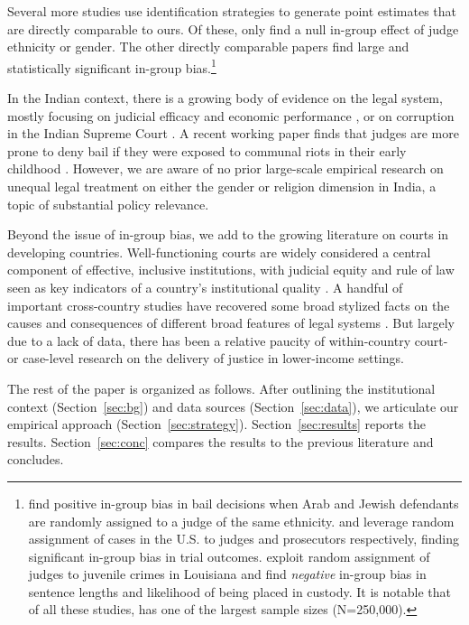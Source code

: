 \documentclass[12pt,english]{article}
\begin{document}
Several more studies use identification strategies to generate point estimates that are directly comparable to ours. Of these, only \citet{lim2016judges} find a null in-group effect of judge ethnicity or gender. The other directly comparable papers find large and statistically significant in-group bias.\footnote{\citet{gazal2010let} find positive in-group bias in bail decisions when Arab and Jewish defendants are randomly assigned to a judge of the same ethnicity. \citet{knepper2018shadow} and \citet{sloane2019racial} leverage random assignment of cases in the U.S. to judges and prosecutors respectively, finding significant in-group bias in trial outcomes. \citet{depew2017judges} exploit random assignment of judges to juvenile crimes in Louisiana and find \textit{negative} in-group bias in sentence lengths and likelihood of being placed in custody. It is notable that of all these studies, \citet{lim2016judges} has one of the largest sample sizes (N=250,000).}

In the Indian context, there is a growing body of evidence on the legal system, mostly focusing on judicial efficacy and economic performance \citep{Chemin2009JoCE,rao2019judges}, or on corruption in the Indian Supreme Court \citep{aney2017jobs}. A recent working paper finds that judges are more prone to deny bail if they were exposed to communal riots in their early childhood \citep{bhartiroy2020}. However, we are aware of no prior large-scale empirical research on unequal legal treatment on either the gender or religion dimension in India, a topic of substantial policy relevance.

Beyond the issue of in-group bias, we add to the growing literature on courts in developing countries. Well-functioning courts are widely considered a central component of effective, inclusive institutions, with judicial equity and rule of law seen as key indicators of a country’s institutional quality \citep{Rodrik2000Sicid,Le2004JoID,Rodrik2005Hoeg,pande2005institutions,Visaria2009AEJAE,lichand2014access,PonticelliAlencar2016TQJoE,world2017world}. A handful of important cross-country studies have recovered some broad stylized facts on the causes and consequences of different broad features of legal systems \citep{DjankovLaPortaLopez-de-SilanesShleifer2003QJoE,la2004judicial,LaPortaLopez-de-SilanesShleifer2008JoEL}. But largely due to a lack of data, there has been a relative paucity of within-country court- or case-level research on the delivery of justice in lower-income settings.

The rest of the paper is organized as follows. After outlining the institutional context (Section~\ref{sec:bg}) and data sources (Section~\ref{sec:data}), we articulate our empirical approach (Section~\ref{sec:strategy}). Section~\ref{sec:results} reports the results. Section~\ref{sec:conc} compares the results to the previous literature and concludes.
\end{document}
